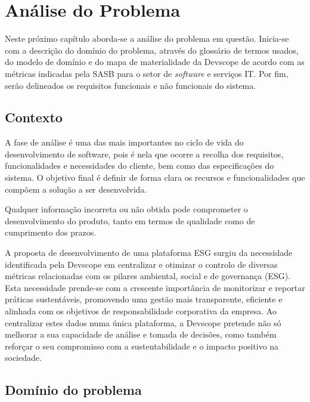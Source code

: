 
\chapter{Análise do Problema}
\label{sec:AP}

Neste próximo capítulo aborda-se a análise do problema em questão. Inicia-se com a descrição do domínio do problema, através do glossário de termos usados, do modelo de domínio e do mapa de materialidade da Devscope de acordo com as métricas indicadas pela \gls{SASB} para o setor de \textit{software} e serviços IT. Por fim, serão delineados os requisitos funcionais e não funcionais do sistema.

\section{Contexto}
\label{sec:Context}

A fase de análise é uma das mais importantes no ciclo de vida do desenvolvimento de software, pois é nela que ocorre a recolha dos requisitos, funcionalidades e necessidades do cliente, bem como das especificações do sistema. O objetivo final é definir de forma clara os recursos e funcionalidades que compõem a solução a ser desenvolvida.

Qualquer informação incorreta ou não obtida pode comprometer o desenvolvimento do produto, tanto em termos de qualidade como de cumprimento dos prazos.

A proposta de desenvolvimento de uma plataforma ESG surgiu da necessidade identificada pela Devscope em centralizar e otimizar o controlo de diversas métricas relacionadas com os pilares ambiental, social e de governança (ESG). Esta necessidade prende-se com a crescente importância de monitorizar e reportar práticas sustentáveis, promovendo uma gestão mais transparente, eficiente e alinhada com os objetivos de responsabilidade corporativa da empresa. Ao centralizar estes dados numa única plataforma, a Devscope pretende não só melhorar a sua capacidade de análise e tomada de decisões, como também reforçar o seu compromisso com a sustentabilidade e o impacto positivo na sociedade.

\section{Domínio do problema}
\label{sec:DP} 

